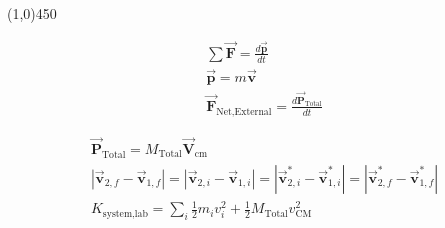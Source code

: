 \documentclass[9pt,letterpaper]{article}
\newcommand{\vect}[1]{\vec{\boldsymbol{#1}}}
\begin{document}
\vspace{-0.3in}
\begin{center}
\line(1,0){450}
\end{center}
\vspace{-0.3in}
\begin{minipage}[t]{0.4\linewidth}
\hspace{0.4in}
\begin{align*}
    &\sum\vect{F}=\frac{d\vect{p}}{dt}\\
    &\vect{p} = m\vect{v}\\
    &\vect{F}_{\text{Net,External}}=\frac{d\vect{P}_{\text{Total}}}{dt}
\end{align*}
\end{minipage}
\hspace{-0.3in}
\begin{minipage}[t]{0.6\linewidth}
\begin{align*}
    &\vect{P}_{\text{Total}}=M_{\text{Total}}\vect{V}_{\text{cm}}\\
    &|\vect{v}_{2,f}-\vect{v}_{1,f}|=
    |\vect{v}_{2,i}-\vect{v}_{1,i}|=
    |\vect{v}_{2,i}^{*}-\vect{v}_{1,i}^{*}|=
    |\vect{v}_{2,f}^{*}-\vect{v}_{1,f}^{*}|\\
    &K_{\text{system,lab}} = \sum_{i}{\frac{1}{2}m_{i}v_{i}^{2}}+\frac{1}{2}M_{\text{Total}}v_{\text{CM}}^{2}\\
\end{align*}
\end{minipage}
\vspace{-0.4in}
\end{document}
